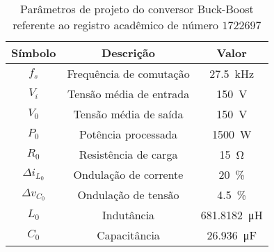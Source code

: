 \begin{table}[!ht]
\centering
\caption{Parâmetros de projeto do conversor Buck-Boost referente ao registro acadêmico de número $1722697$}
\label{tab:parametros}
\begin{tabular}{@{}ccc@{}}
\toprule
\textbf{Símbolo} & \textbf{Descrição} & \textbf{Valor}\\ \midrule
$f_s$ & Frequência de comutação & \SI{27.5}{\kilo\hertz}\\
$V_i$ & Tensão média de entrada  & \SI{150}{\V}\\
$V_0$ & Tensão média de saída  & \SI{150}{\V} \\
$P_0$ & Potência processada  & \SI{1500}{\W} \\
$R_0$ & Resistência de carga & \SI{15}{\ohm} \\
$\Delta{i_{L_0}}$  & Ondulação de corrente & \SI{20}{\%}\\
$\Delta{v_{C_0}}$  & Ondulação de tensão & \SI{4.5}{\%}\\
$L_0$ & Indutância & \SI{681.8182}{\micro\henry}\\
$C_0$ & Capacitância & \SI{26.936}{\micro\farad}\\
\bottomrule
\end{tabular}
\end{table}

